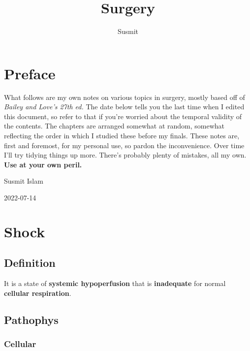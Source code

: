 \documentclass[
  12pt,
]{memoir}
\title{Surgery}
\author{Susmit}
\date{}
\begin{document}
\frontmatter

\maketitle

\mainmatter
\openany  \raggedbottom \twocoltocetc \tableofcontents

\pagebreak

\hypertarget{preface}{%
\chapter*{Preface}\label{preface}}

What follows are my own notes on various topics in surgery, mostly based
off of \emph{Bailey and Love's 27th ed.} The date below tells you the
last time when I edited this document, so refer to that if you're
worried about the temporal validity of the contents. The chapters are
arranged somewhat at random, somewhat reflecting the order in which I
studied these before my finals. These notes are, first and foremost, for
my personal use, so pardon the inconvenience. Over time I'll try tidying
things up more. There's probably plenty of mistakes, all my own.
\textbf{Use at your own peril.}

\hfill Susmit Islam

\hfill 2022-07-14

\hypertarget{shock}{%
\chapter{Shock}\label{shock}}

\hypertarget{definition}{%
\section{Definition}\label{definition}}

It is a state of \textbf{systemic hypoperfusion} that is
\textbf{inadequate} for normal \textbf{cellular respiration}.

\hypertarget{pathophys}{%
\section{Pathophys}\label{pathophys}}

\hypertarget{cellular}{%
\subsection{Cellular}\label{cellular}}
\end{document}
